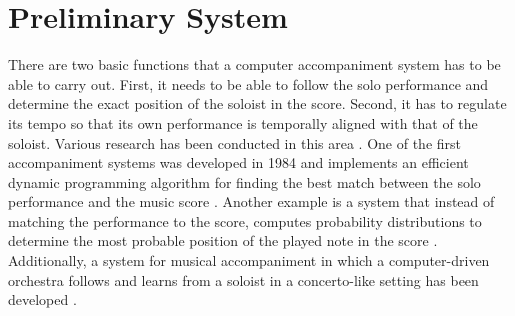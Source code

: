 \documentclass[12pt]{scrartcl}
\begin{document}


\section{Preliminary System}
\label{perliminary-system}
There are two basic functions that a computer accompaniment system has to be able to carry out. First, it needs to be able to follow the solo performance and determine the exact position of the soloist in the score. Second, it has to regulate its tempo so that its own performance is temporally aligned with that of the soloist. Various research has been conducted in this area \citep{music-score-alignment}. One of the first accompaniment systems was developed in 1984 and implements an efficient dynamic programming algorithm for finding the best match between the solo performance and the music score \citep{dannenberg}. Another example is a system that instead of matching the performance to the score, computes probability distributions to determine the most probable position of the played note in the score \citep{nakamura}. Additionally, a system for musical accompaniment in which a computer-driven orchestra follows and learns from a soloist in a concerto-like setting has been developed \citep{raphael2010music}.
\end{document}
